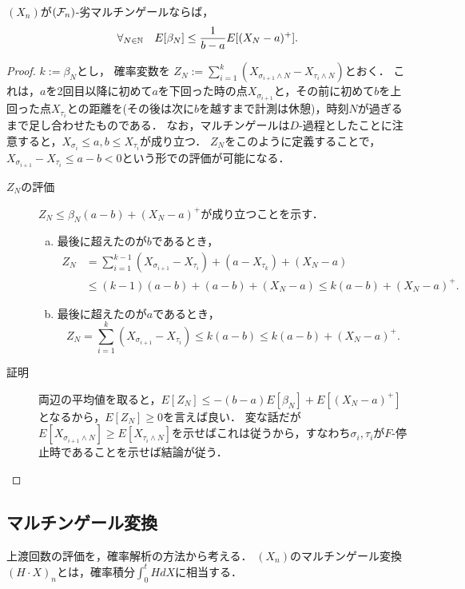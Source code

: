 \documentclass[uplatex,dvipdfmx]{jsreport}
\begin{document}
\begin{theorem}
    $(X_n)$が$(\mathcal{F}_n)$-劣マルチンゲールならば，
    \[\forall_{N\in\mathbb{N}}\quad E[\beta_N]\le\frac{1}{b-a}E[(X_N-a)^+].\]
\end{theorem}
\begin{proof}
    $k:=\beta_N$とし，
    確率変数を
    $Z_N:=\sum^k_{i=1}(X_{\sigma_{i+1}\land N}-X_{\tau_i\land N})$とおく．
    これは，$a$を2回目以降に初めて$a$を下回った時の点$X_{\sigma_{i+1}}$と，その前に初めて$b$を上回った点$X_{\tau_i}$との距離を(その後は次に$b$を越すまで計測は休憩)，時刻$N$が過ぎるまで足し合わせたものである．
    なお，マルチンゲールは$D$-過程としたことに注意すると，$X_{\sigma_i}\le a,b\le X_{\tau_i}$が成り立つ．
    $Z_N$をこのように定義することで，$X_{\sigma_{i+1}}-X_{\tau_i}\le a-b<0$という形での評価が可能になる．
    \begin{description}
        \item[$Z_N$の評価] $Z_N\le\beta_N(a-b)+(X_N-a)^+$が成り立つことを示す．
        \begin{enumerate}[(a)]
            \item 最後に超えたのが$b$であるとき，
            \begin{align*}
                Z_N&=\sum^{k-1}_{i=1}(X_{\sigma_{i+1}}-X_{\tau_i})+(a-X_{\tau_k})+(X_N-a)\\
                &\le(k-1)(a-b)+(a-b)+(X_N-a)\le k(a-b)+(X_N-a)^+.
            \end{align*}
            \item 最後に超えたのが$a$であるとき，
            \[Z_N=\sum^k_{i=1}(X_{\sigma_{i+1}}-X_{\tau_i})\le k(a-b)\le k(a-b)+(X_N-a)^+.\]
        \end{enumerate}
        \item[証明] 両辺の平均値を取ると，$E[Z_N]\le-(b-a)E[\beta_N]+E[(X_N-a)^+]$となるから，$E[Z_N]\ge0$を言えば良い．
        変な話だが$E[X_{\sigma_{i+1}\land N}]\ge E[X_{\tau_i\land N}]$を示せばこれは従うから，すなわち$\sigma_i,\tau_i$が$F$-停止時であることを示せば結論が従う．

    \end{description}
\end{proof}

\subsection{マルチンゲール変換}

\begin{tcolorbox}[colframe=ForestGreen, colback=ForestGreen!10!white,breakable,colbacktitle=ForestGreen!40!white,coltitle=black,fonttitle=\bfseries\sffamily,
title=]
    上渡回数の評価を，確率解析の方法から考える．
    $(X_n)$のマルチンゲール変換$(H\cdot X)_n$とは，確率積分$\int^t_0HdX$に相当する．
\end{tcolorbox}
\end{document}
